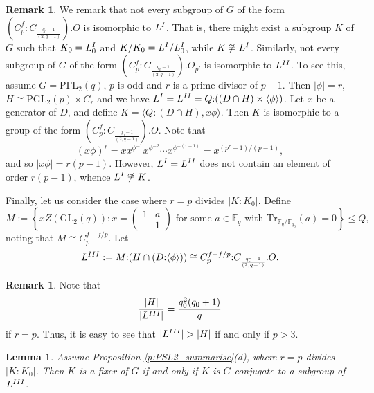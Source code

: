 \documentclass[twoside,a4paper,reqno,11pt]{amsart}
\newcommand{\<}{\langle}
\renewcommand{\>}{\rangle}
\newcommand{\la}{\langle}
\newcommand{\ra}{\rangle}
\newcommand{\leqs}{\leqslant}
\newcommand{\GL}{\mathrm{GL}}
\newcommand{\PGL}{\mathrm{PGL}}
\newcommand{\PGammaL}{\mathrm{P\Gamma L}}
\newcommand{\Tr}{\mathrm{Tr}}
\newtheorem{lem}[thm]{Lemma}
\theoremstyle{definition}
\newtheorem{rem}[thm]{Remark}
\begin{document}
	\begin{rem}
		\label{r:LI_LII}
		We remark that not every subgroup of $G$ of the form $(C_p^f{:}C_{\frac{q_0-1}{(2,q-1)}}).O$ is isomorphic to $L^{\rm{I}}$. That is, there might exist a subgroup $K$ of $G$ such that $K_0 = L_0^{\rm I}$ and $K/K_0 = L^{\rm I}/L^{\rm I}_0$, while $K\not\cong L^{\rm I}$. Similarly, not every subgroup of $G$ of the form $(C_p^f{:}C_{\frac{q_0-1}{(2,q-1)}}).O_{p'}$ is isomorphic to $L^{\rm{II}}$. To see this, assume $G = \PGammaL_2(q)$, $p$ is odd and $r$ is a prime divisor of $p-1$. Then $|\phi| = r$, $H\cong \PGL_2(p)\times C_r$ and we have $L^{\rm I} = L^{\rm II} = Q{:}((D\cap H)\times \la\phi\ra)$. Let $x$ be a generator of $D$, and define $K = \la Q{:}(D\cap H),x\phi\ra$. Then $K$ is isomorphic to a group of the form $(C_p^f{:}C_{\frac{q_0-1}{(2,q-1)}}).O$. Note that
		\begin{equation*}
		(x\phi)^r = xx^{\phi^{-1}}x^{\phi^{-2}}\cdots x^{\phi^{-(r-1)}} = x^{(p^r-1)/(p-1)},
		\end{equation*}
		and so $|x\phi| = r(p-1)$. However, $L^{\rm I} = L^{\rm II}$ does not contain an element of order $r(p-1)$, whence $L^{\rm I}\not\cong K$.
	\end{rem}
	
	Finally, let us consider the case where $r = p$ divides $|K:K_0|$. Define
	\begin{equation*}
	M:=\left\{xZ(\GL_2(q)):x =
	\begin{pmatrix}
	1&a\\
	&1
	\end{pmatrix}
	\mbox{ for some }a\in\mathbb{F}_q\mbox{ with }\Tr_{\mathbb{F}_q/\mathbb{F}_{q_0}}(a) = 0
	\right\}\leqs Q,
	\end{equation*}
	noting that $M\cong C_p^{f-f/p}$. Let
	\begin{equation}
	\label{e:LIII}
	L^{\rm III} := M{:}(H\cap (D{:}\la\phi\ra))\cong C_p^{f-f/p}{:}C_{\frac{q_0-1}{(2,q-1)}}.O.
	\end{equation}
	
	\begin{rem}
		\label{r:LIII_order}
		Note that
		\begin{equation*}
		\frac{|H|}{|L^{\rm III}|} = \frac{q_0^2(q_0+1)}{q}
		\end{equation*}
		if $r = p$. Thus, it is easy to see that $|L^{\rm III}| > |H|$ if and only if $p > 3$.
	\end{rem}
	
	\begin{lem}
		\label{l:PSL2_d_III}
		Assume Proposition \ref{p:PSL2_summarise}(d), where $r = p$ divides $|K:K_0|$. Then $K$ is a fixer of $G$ if and only if $K$ is $G$-conjugate to a subgroup of $L^{\rm III}$.
	\end{lem}
	
\end{document}
